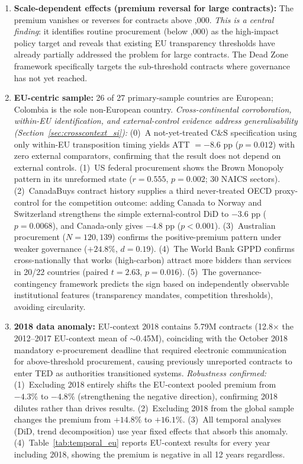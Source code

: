\documentclass[11pt]{article}
\begin{document}
\begin{enumerate}
\item \textbf{Scale-dependent effects (premium reversal for large contracts):} The premium vanishes or reverses for contracts above ,000. \textit{This is a central finding}: it identifies routine procurement (below ,000) as the high-impact policy target and reveals that existing EU transparency thresholds have already partially addressed the problem for large contracts. The Dead Zone framework specifically targets the sub-threshold contracts where governance has not yet reached.

\item \textbf{EU-centric sample:} 26 of 27 primary-sample countries are European; Colombia is the sole non-European country. \textit{Cross-continental corroboration, within-EU identification, and external-control evidence address generalisability (Section~\ref{sec:crosscontext_si}):} (0)~A not-yet-treated C\&S specification using only within-EU transposition timing yields ATT $= -8.6$ pp ($p = 0.012$) with zero external comparators, confirming that the result does not depend on external controls. (1)~US federal procurement shows the Brown Monopoly pattern in its unreformed state ($r = 0.555$, $p = 0.002$; 30 NAICS sectors). (2)~CanadaBuys contract history supplies a third never-treated OECD proxy-control for the competition outcome: adding Canada to Norway and Switzerland strengthens the simple external-control DiD to $-3.6$ pp ($p = 0.0068$), and Canada-only gives $-4.8$ pp ($p < 0.001$). (3)~Australian procurement ($N = 120{,}139$) confirms the positive-premium pattern under weaker governance ($+24.8\%$, $d = 0.19$). (4)~The World Bank GPPD confirms cross-nationally that works (high-carbon) attract more bidders than services in 20/22 countries (paired $t = 2.63$, $p = 0.016$). (5)~The governance-contingency framework predicts the sign based on independently observable institutional features (transparency mandates, competition thresholds), avoiding circularity.

\item \textbf{2018 data anomaly:} EU-context 2018 contains 5.79M contracts (12.8$\times$ the 2012--2017 EU-context mean of ${\sim}$0.45M), coinciding with the October 2018 mandatory e-procurement deadline that required electronic communication for above-threshold procurement, causing previously unreported contracts to enter TED as authorities transitioned systems. \textit{Robustness confirmed:} (1)~Excluding 2018 entirely shifts the EU-context pooled premium from $-4.3\%$ to $-4.8\%$ (strengthening the negative direction), confirming 2018 dilutes rather than drives results. (2)~Excluding 2018 from the global sample changes the premium from $+14.8\%$ to $+16.1\%$. (3)~All temporal analyses (DiD, trend decomposition) use year fixed effects that absorb this anomaly. (4)~Table~\ref{tab:temporal_eu} reports EU-context results for every year including 2018, showing the premium is negative in all 12 years regardless.


\end{enumerate}
\end{document}
